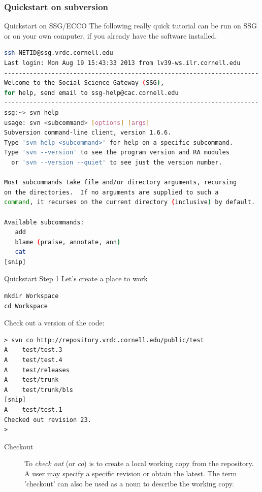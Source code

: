 \documentclass[xcolor=table,compress]{beamer}
\begin{document}
\subsubsection{Quickstart on subversion}
\begin{frame}[fragile]{Quickstart on SSG/ECCO}
The following really quick tutorial can be run on SSG or on your own computer, if you already have the software installed.\color{blue}
\begin{lstlisting}[language=bash,numbers=none]
ssh NETID@ssg.vrdc.cornell.edu
Last login: Mon Aug 19 15:43:33 2013 from lv39-ws.ilr.cornell.edu
----------------------------------------------------------------------
Welcome to the Social Science Gateway (SSG),
for help, send email to ssg-help@cac.cornell.edu
----------------------------------------------------------------------
ssg:~> svn help
usage: svn <subcommand> [options] [args]
Subversion command-line client, version 1.6.6.
Type 'svn help <subcommand>' for help on a specific subcommand.
Type 'svn --version' to see the program version and RA modules
  or 'svn --version --quiet' to see just the version number.

Most subcommands take file and/or directory arguments, recursing
on the directories.  If no arguments are supplied to such a
command, it recurses on the current directory (inclusive) by default.

Available subcommands:
   add
   blame (praise, annotate, ann)
   cat
[snip]
\end{lstlisting}
\end{frame}

\lstset{language=bash,numbers=none}
\begin{frame}[fragile]{Quickstart Step 1}
Let's create a place to work\color{blue}
\begin{lstlisting}
mkdir Workspace
cd Workspace
\end{lstlisting}
\pause\color{black}
Check out a version of the code:\color{blue}
\begin{lstlisting}
> svn co http://repository.vrdc.cornell.edu/public/test
A    test/test.3
A    test/test.4
A    test/releases
A    test/trunk
A    test/trunk/bls
[snip]
A    test/test.1
Checked out revision 23.
> 
\end{lstlisting}
\small\color{black}
\begin{description}
\item[Checkout] 
To \textit{check out} (or \textit{co}) is to create a local working copy from the repository. A user may specify a specific revision or obtain the latest. The term 'checkout' can also be used as a noun to describe the working copy. 
\end{description}
\end{frame}
\end{document}

